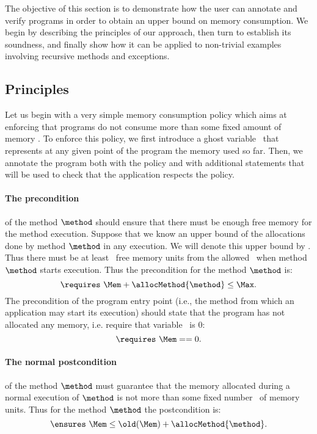 The objective of this section is to demonstrate how the user can
annotate and verify programs in order to obtain an upper bound on
memory consumption. We begin by describing the principles of our
approach, then turn to establish its soundness, and finally show
how it can be applied to non-trivial examples involving recursive
methods and exceptions.


\subsection{Principles}
Let us begin with a very simple memory consumption policy which aims
at enforcing that  programs do not consume more than
some fixed amount of memory \Max . To enforce this policy, we first
introduce a ghost variable \Mem\ that represents at any given point of
the program the memory used so far. Then, we annotate the program both
with the policy and with additional statements that will be used to
check that the application respects the policy.



\paragraph{The precondition} of the method $\method$ should ensure that
there must be enough free memory for the method execution. Suppose
that we know an upper bound of the allocations done by method $\method$
in any execution. We will denote this upper bound by
\allocMethod{\method}. Thus there must be at least
\allocMethod{\method}\ free memory units from the allowed \Max\ when
method $\method$ starts execution. Thus the precondition for the method
$\method$ is:
$$
\requires \ \Mem + \allocMethod{\method}  \leq \Max.
$$
The precondition of the
program entry point (i.e., the method from which an application
may start its execution) should state that the program has not
allocated any memory, i.e. require that variable \Mem \ is  0:
$$
\requires \ \Mem == 0.
$$
\paragraph{The normal postcondition} of the method $\method$ must
guarantee that the memory allocated during a normal execution of
$\method$ is not more than some fixed number \allocMethod{\method}\
of memory units. Thus for the method $\method$ the postcondition is:
$$
\ensures \  \Mem \leq \old(\Mem) + \allocMethod{\method}.
$$


